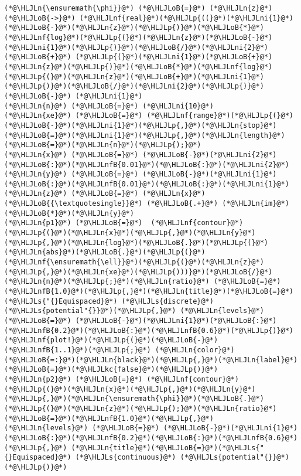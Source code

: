 \documentclass[12pt,a4paper]{article}
\newcommand{\HLJLkc}[1]{\textcolor[RGB]{59,151,46}{\textit{#1}}}
\newcommand{\HLJLn}[1]{#1}
\newcommand{\HLJLnf}[1]{\textcolor[RGB]{66,102,213}{#1}}
\newcommand{\HLJLs}[1]{\textcolor[RGB]{201,61,57}{#1}}
\newcommand{\HLJLnfB}[1]{\textcolor[RGB]{59,151,46}{#1}}
\newcommand{\HLJLni}[1]{\textcolor[RGB]{59,151,46}{#1}}
\newcommand{\HLJLoB}[1]{\textcolor[RGB]{102,102,102}{\textbf{#1}}}
\newcommand{\HLJLp}[1]{#1}
\begin{document}
\begin{lstlisting}
(*@\HLJLn{\ensuremath{\phi}}@*) (*@\HLJLoB{=}@*) (*@\HLJLn{z}@*) (*@\HLJLoB{->}@*) (*@\HLJLnf{real}@*)(*@\HLJLp{((}@*)(*@\HLJLni{1}@*)(*@\HLJLoB{-}@*)(*@\HLJLn{z}@*)(*@\HLJLp{)}@*)(*@\HLJLoB{*}@*)(*@\HLJLnf{log}@*)(*@\HLJLp{(}@*)(*@\HLJLn{z}@*)(*@\HLJLoB{-}@*)(*@\HLJLni{1}@*)(*@\HLJLp{)}@*)(*@\HLJLoB{/}@*)(*@\HLJLni{2}@*) (*@\HLJLoB{+}@*) (*@\HLJLp{(}@*)(*@\HLJLni{1}@*)(*@\HLJLoB{+}@*)(*@\HLJLn{z}@*)(*@\HLJLp{)}@*)(*@\HLJLoB{*}@*)(*@\HLJLnf{log}@*)(*@\HLJLp{(}@*)(*@\HLJLn{z}@*)(*@\HLJLoB{+}@*)(*@\HLJLni{1}@*)(*@\HLJLp{)}@*)(*@\HLJLoB{/}@*)(*@\HLJLni{2}@*)(*@\HLJLp{)}@*) (*@\HLJLoB{-}@*) (*@\HLJLni{1}@*)
(*@\HLJLn{n}@*) (*@\HLJLoB{=}@*) (*@\HLJLni{10}@*)
(*@\HLJLn{xe}@*) (*@\HLJLoB{=}@*) (*@\HLJLnf{range}@*)(*@\HLJLp{(}@*)(*@\HLJLoB{-}@*)(*@\HLJLni{1}@*)(*@\HLJLp{,}@*)(*@\HLJLn{stop}@*)(*@\HLJLoB{=}@*)(*@\HLJLni{1}@*)(*@\HLJLp{,}@*)(*@\HLJLn{length}@*)(*@\HLJLoB{=}@*)(*@\HLJLn{n}@*)(*@\HLJLp{);}@*)
(*@\HLJLn{x}@*) (*@\HLJLoB{=}@*) (*@\HLJLoB{-}@*)(*@\HLJLni{2}@*)(*@\HLJLoB{:}@*)(*@\HLJLnfB{0.01}@*)(*@\HLJLoB{:}@*)(*@\HLJLni{2}@*)
(*@\HLJLn{y}@*) (*@\HLJLoB{=}@*) (*@\HLJLoB{-}@*)(*@\HLJLni{1}@*)(*@\HLJLoB{:}@*)(*@\HLJLnfB{0.01}@*)(*@\HLJLoB{:}@*)(*@\HLJLni{1}@*)
(*@\HLJLn{z}@*) (*@\HLJLoB{=}@*) (*@\HLJLn{x}@*)(*@\HLJLoB{{\textquotesingle}}@*) (*@\HLJLoB{.+}@*) (*@\HLJLn{im}@*)(*@\HLJLoB{*}@*)(*@\HLJLn{y}@*)
(*@\HLJLn{p1}@*) (*@\HLJLoB{=}@*)  (*@\HLJLnf{contour}@*)(*@\HLJLp{(}@*)(*@\HLJLn{x}@*)(*@\HLJLp{,}@*)(*@\HLJLn{y}@*)(*@\HLJLp{,}@*)(*@\HLJLn{log}@*)(*@\HLJLoB{.}@*)(*@\HLJLp{(}@*)(*@\HLJLn{abs}@*)(*@\HLJLoB{.}@*)(*@\HLJLp{(}@*)(*@\HLJLnf{\ensuremath{\ell}}@*)(*@\HLJLp{(}@*)(*@\HLJLn{z}@*)(*@\HLJLp{,}@*)(*@\HLJLn{xe}@*)(*@\HLJLp{)))}@*)(*@\HLJLoB{/}@*)(*@\HLJLn{n}@*)(*@\HLJLp{;}@*)(*@\HLJLn{ratio}@*) (*@\HLJLoB{=}@*) (*@\HLJLnfB{1.0}@*)(*@\HLJLp{,}@*)(*@\HLJLn{title}@*)(*@\HLJLoB{=}@*)(*@\HLJLs{"{}Equispaced}@*) (*@\HLJLs{discrete}@*) (*@\HLJLs{potential"{}}@*)(*@\HLJLp{,}@*) (*@\HLJLn{levels}@*)(*@\HLJLoB{=}@*) (*@\HLJLoB{-}@*)(*@\HLJLni{1}@*)(*@\HLJLoB{:}@*)(*@\HLJLnfB{0.2}@*)(*@\HLJLoB{:}@*)(*@\HLJLnfB{0.6}@*)(*@\HLJLp{)}@*)
(*@\HLJLnf{plot!}@*)(*@\HLJLp{(}@*)(*@\HLJLoB{-}@*)(*@\HLJLnfB{1..1}@*)(*@\HLJLp{;}@*) (*@\HLJLn{color}@*)(*@\HLJLoB{=:}@*)(*@\HLJLn{black}@*)(*@\HLJLp{,}@*)(*@\HLJLn{label}@*)(*@\HLJLoB{=}@*)(*@\HLJLkc{false}@*)(*@\HLJLp{)}@*)
(*@\HLJLn{p2}@*) (*@\HLJLoB{=}@*) (*@\HLJLnf{contour}@*)(*@\HLJLp{(}@*)(*@\HLJLn{x}@*)(*@\HLJLp{,}@*)(*@\HLJLn{y}@*)(*@\HLJLp{,}@*)(*@\HLJLn{\ensuremath{\phi}}@*)(*@\HLJLoB{.}@*)(*@\HLJLp{(}@*)(*@\HLJLn{z}@*)(*@\HLJLp{);}@*)(*@\HLJLn{ratio}@*)(*@\HLJLoB{=}@*)(*@\HLJLnfB{1.0}@*)(*@\HLJLp{,}@*) (*@\HLJLn{levels}@*) (*@\HLJLoB{=}@*) (*@\HLJLoB{-}@*)(*@\HLJLni{1}@*)(*@\HLJLoB{:}@*)(*@\HLJLnfB{0.2}@*)(*@\HLJLoB{:}@*)(*@\HLJLnfB{0.6}@*)(*@\HLJLp{,}@*) (*@\HLJLn{title}@*)(*@\HLJLoB{=}@*)(*@\HLJLs{"{}Equispaced}@*) (*@\HLJLs{continuous}@*) (*@\HLJLs{potential"{}}@*)(*@\HLJLp{)}@*)

\end{lstlisting}
\end{document}
